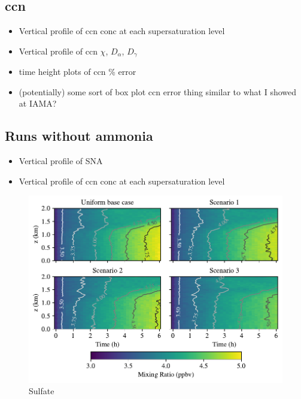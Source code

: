 \subsection{ccn}

\begin{itemize}
\item Vertical profile of ccn conc at each supersaturation level
\item Vertical profile of ccn $\chi$, $D_{\alpha}$, $D_{\gamma}$
\item time height plots of ccn \% error
\item (potentially) some sort of box plot ccn error thing similar to what I showed at IAMA?
\end{itemize}

\subsection{Runs without ammonia}

\begin{itemize}
\item Vertical profile of SNA
\item Vertical profile of ccn conc at each supersaturation level
\end{itemize}

\newpage
\begin{figure}[h]
  \centering
    \includegraphics[width=\textwidth]{figures/chapter5/height-time-pmc_SO4-four-scenarios.pdf}
    \caption{Sulfate}
    \label{fig:ht-so4}
\end{figure}

